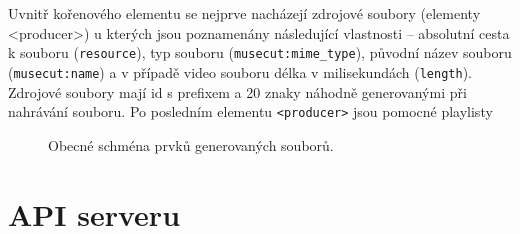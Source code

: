Uvnitř kořenového elementu se nejprve  nacházejí zdrojové soubory (elementy <producer>) u kterých jsou poznamenány následující vlastnosti -- absolutní cesta k souboru (\texttt{resource}), typ souboru (\texttt{musecut:mime\_type}), původní název souboru (\texttt{musecut:name}) a v případě video souboru délka v milisekundách (\texttt{length}). Zdrojové soubory mají id s prefixem  a 20 znaky náhodně generovanými při nahrávání souboru.
Po posledním elementu \texttt{<producer>} jsou pomocné playlisty
\begin{figure}[h]
	\centering
	\caption{Obecné schména prvků generovaných souborů.}\label{img:schemaXML}
\end{figure}


\section{API serveru}
